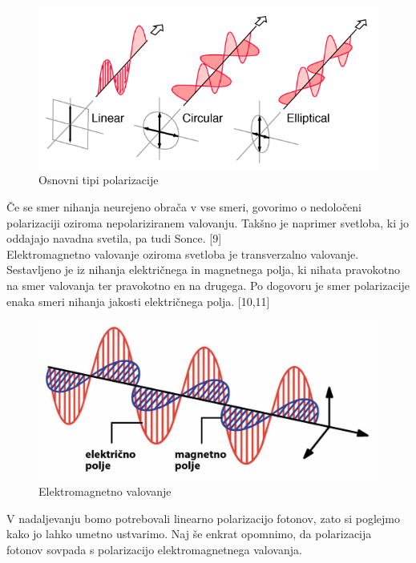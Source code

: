 \documentclass[A4paper, 11pt]{article}
\begin{document}
\begin{figure}[h]
\centering
\caption{Osnovni tipi polarizacije}
\includegraphics[scale=2]{polcls}
\end{figure}

\pagebreak

Če se smer nihanja neurejeno obrača v vse smeri, govorimo o nedoločeni polarizaciji oziroma nepolariziranem valovanju. Takšno je naprimer svetloba, ki jo oddajajo navadna svetila, pa tudi Sonce. [9] \\

Elektromagnetno valovanje oziroma svetloba je transverzalno valovanje. Sestavljeno je iz nihanja električnega in magnetnega polja, ki nihata pravokotno na smer valovanja ter pravokotno en na drugega. Po dogovoru je smer polarizacije enaka smeri nihanja jakosti električnega polja. [10,11]

\begin{figure}[h]
\centering
\caption{Elektromagnetno valovanje}
\includegraphics[scale=0.7]{emv}
\end{figure}

V nadaljevanju bomo potrebovali linearno polarizacijo fotonov, zato si poglejmo kako jo lahko umetno ustvarimo. Naj še enkrat opomnimo, da polarizacija fotonov sovpada s polarizacijo elektromagnetnega valovanja. 
\end{document}
